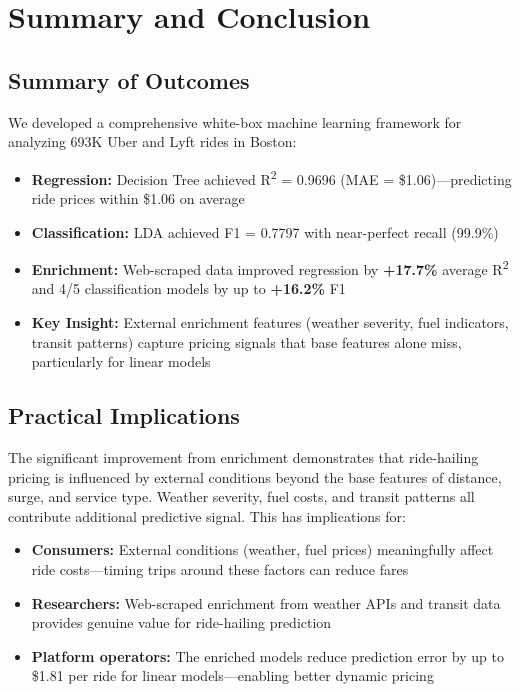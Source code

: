 \documentclass[12pt,a4paper]{article}
\begin{document}
\newpage

\section{Summary and Conclusion}

\subsection{Summary of Outcomes}

We developed a comprehensive white-box machine learning framework for analyzing 693K Uber and Lyft rides in Boston:

\begin{itemize}
    \item \textbf{Regression:} Decision Tree achieved R\textsuperscript{2} = 0.9696 (MAE = \$1.06)---predicting ride prices within \$1.06 on average
    \item \textbf{Classification:} LDA achieved F1 = 0.7797 with near-perfect recall (99.9\%)
    \item \textbf{Enrichment:} Web-scraped data improved regression by \textbf{+17.7\%} average R\textsuperscript{2} and 4/5 classification models by up to \textbf{+16.2\%} F1
    \item \textbf{Key Insight:} External enrichment features (weather severity, fuel indicators, transit patterns) capture pricing signals that base features alone miss, particularly for linear models
\end{itemize}

\subsection{Practical Implications}

The significant improvement from enrichment demonstrates that ride-hailing pricing is influenced by external conditions beyond the base features of distance, surge, and service type. Weather severity, fuel costs, and transit patterns all contribute additional predictive signal. This has implications for:

\begin{itemize}
    \item \textbf{Consumers:} External conditions (weather, fuel prices) meaningfully affect ride costs---timing trips around these factors can reduce fares
    \item \textbf{Researchers:} Web-scraped enrichment from weather APIs and transit data provides genuine value for ride-hailing prediction
    \item \textbf{Platform operators:} The enriched models reduce prediction error by up to \$1.81 per ride for linear models---enabling better dynamic pricing
\end{itemize}
\end{document}
